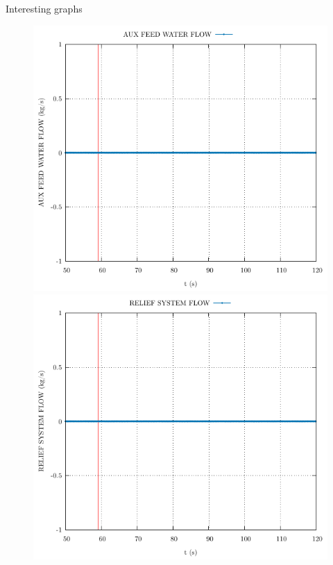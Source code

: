	\begin{frame}{Interesting graphs}
	\begin{figure}
		\centering
		\begin{minipage}{.5\textwidth}
			\centering
			\includegraphics[width=0.8\linewidth]{./graphs/AUX FEED WATER FLOW_comp.pdf}
		\end{minipage}%
		\begin{minipage}{.5\textwidth}
			\centering
			\includegraphics[width=0.8\linewidth]{./graphs/RELIEF SYSTEM FLOW_comp.pdf}
		\end{minipage}
	\end{figure}
	
	
\end{frame}


